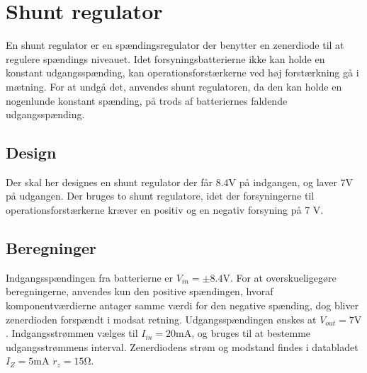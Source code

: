\section{Shunt regulator}\label{sec:shunt}
En shunt regulator er en spændingsregulator der benytter en zenerdiode til at regulere spændings niveauet.
Idet forsyningsbatterierne ikke kan holde en konstant udgangsspænding, kan operationsforstærkerne ved høj forstærkning gå i mætning. 
For at undgå det, anvendes shunt regulatoren, da den kan holde en nogenlunde konstant spænding, på trods af batteriernes faldende udgangsspænding.

\subsection{Design}
Der skal her designes en shunt regulator der får $8.4 \si{\volt}$ på indgangen, og laver $7\si{\volt}$ på udgangen.
Der bruges to shunt regulatore, idet der forsyningerne til operationsforstærkerne kræver en positiv og en negativ forsyning på 7 \si{\volt}.

\subsection{Beregninger}
Indgangsspændingen fra batterierne er $V_{in} = \pm 8.4 \si{\volt}$. 
For at overskueligegøre beregningerne, anvendes kun den positive spændingen, hvoraf komponentværdierne antager samme værdi for den negative spænding, dog bliver zenerdioden forspændt i modsat retning.
Udgangsspændingen ønskes at $V_{out} = 7 \si{\volt}$. 
Indgangsstrømmen vælges til $I_{in} = 20\si{\milli\ampere}$, og bruges til at bestemme udgangsstrømmens interval.
Zenerdiodens strøm og modstand findes i databladet $I_Z = 5 \si{\milli\ampere}$ $r_z = 15 \si{\ohm}$.

